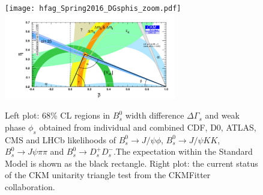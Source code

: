 
\begin{figure}[!htb]
\begin{center}
\texttt{[image: hfag\_Spring2016\_DGsphis\_zoom.pdf]}
\includegraphics[width=7.5cm]{rhoeta_small_global.pdf}
\end{center}
\caption{Left plot: 68\% CL regions in $B^{0}_{s}$ width difference $\Delta\Gamma_{s}$
and weak phase $\phi_{s}$ obtained from individual and combined CDF, D0,
ATLAS, CMS and LHCb likelihoods of $B^{0}_{s}\to J/\psi\phi$, $B^{0}_{s}\to
J/\psi KK$, $B^{0}_{s}\to J\psi\pi\pi$ and $B^{0}_{s}\to D_{s}^{+}D_{s}^{-}%
$.The expectation within the Standard Model is shown as the black rectangle. Right plot: the current status of the CKM unitarity triangle test from the CKMFitter collaboration. }%
\label{figphis}%
\end{figure}




